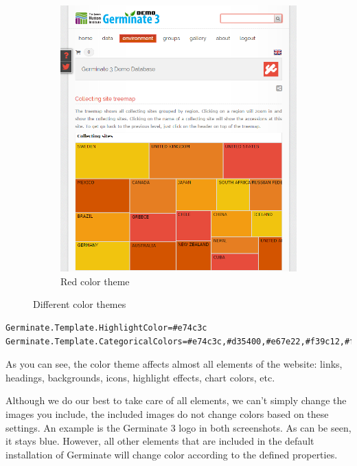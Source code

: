 \begin{figure}[h]
\begin{subfigure}[t]{0.48\textwidth}
		\includegraphics[width=\textwidth]{img/features/themes-red.png}
		\caption{Red color theme}
		\label{subfigure:red-theme}
	\end{subfigure}
	\caption{Different color themes}
	\label{fig:color-themes}
\end{figure}

\begin{lstlisting}[style=Properties]
Germinate.Template.HighlightColor=#e74c3c
Germinate.Template.CategoricalColors=#e74c3c,#d35400,#e67e22,#f39c12,#f1c40f
\end{lstlisting}

\noindent As you can see, the color theme affects almost all elements of the website: links, headings, backgrounds, icons, highlight effects, chart colors, etc.

Although we do our best to take care of all elements, we can't simply change the images you include, \ie the included images do not change colors based on these settings. An example is the Germinate 3 logo in both screenshots. As can be seen, it stays blue. However, all other elements that are included in the default installation of Germinate will change color according to the defined properties.

